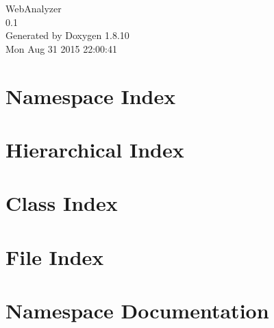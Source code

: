 \documentclass[twoside]{book}
\newcommand{\+}{\discretionary{\mbox{\scriptsize$\hookleftarrow$}}{}{}}
\newcommand{\clearemptydoublepage}{%
  \newpage{\pagestyle{empty}\cleardoublepage}%
}
\begin{document}
\hypersetup{pageanchor=false,
             bookmarks=true,
             bookmarksnumbered=true,
             pdfencoding=unicode
            }
\begin{titlepage}
\vspace*{7cm}
\begin{center}%
{\Large Web\+Analyzer \\[1ex]\large 0.\+1 }\\
\vspace*{1cm}
{\large Generated by Doxygen 1.8.10}\\
\vspace*{0.5cm}
{\small Mon Aug 31 2015 22:00:41}\\
\end{center}
\end{titlepage}
\clearemptydoublepage
\tableofcontents
\clearemptydoublepage
{}
\hypersetup{pageanchor=true}

\chapter{Namespace Index}

\chapter{Hierarchical Index}

\chapter{Class Index}

\chapter{File Index}

\chapter{Namespace Documentation}





















\end{document}
